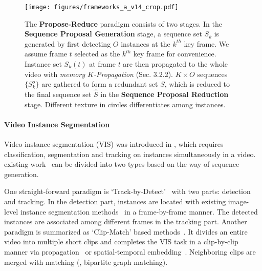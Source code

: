 \documentclass[10pt,twocolumn,letterpaper]{article}
\begin{document}
	\begin{figure*}[t]
		\begin{center}
			\texttt{[image: figures/frameworks\_a\_v14\_crop.pdf]}
		\end{center}
		\caption{The \textbf{Propose-Reduce} paradigm consists of two stages. 
			In the \textbf{Sequence Proposal Generation} stage, a sequence set $S_k$ is generated by first detecting $O$ instances at the $k^{th}$ key frame. We assume frame $t$ selected as the $k^{th}$ key frame for convenience. Instance set $S_k(t)$ at frame $t$ are then propagated to the whole video with \textit{memory $K$-Propagation} (Sec. 3.2.2). $K\times O$ sequences $\{S_k^o\}$ are gathered to form a redundant set $S$, which is reduced to the final sequence set $\widehat{S}$ in the \textbf{Sequence Proposal Reduction} stage. Different texture in circles differentiates among instances.}
		\label{fig:framework_a}
	\end{figure*}
	
	\paragraph{Video Instance Segmentation}
	Video instance segmentation (VIS) was introduced in \cite{yang2019vis}, which requires classification, segmentation and tracking on instances simultaneously in a video. existing work~\cite{yang2019vis,cao2020sipmask,athar2020stem,bertasius2020maskprop,luiten2020unovost,lin2020video} can be divided into two types based on the way of sequence generation.
	
	One straight-forward paradigm is `Track-by-Detect'~\cite{yang2019vis,cao2020sipmask,luiten2020unovost} with two parts: detection and tracking. In the detection part, instances are located with existing image-level instance segmentation methods~\cite{he2017mask} in a frame-by-frame manner. The detected instances are associated among different frames in the tracking part.
	Another paradigm is summarized as `Clip-Match' based methods~\cite{athar2020stem,bertasius2020maskprop}. It divides an entire video into multiple short clips and completes the VIS task in a clip-by-clip manner via propagation~\cite{bertasius2020maskprop} or spatial-temporal embedding~\cite{athar2020stem}. Neighboring clips are merged with matching (\eg, bipartite graph matching). 
	
	\vspace{-0.05in}
	
\end{document}

